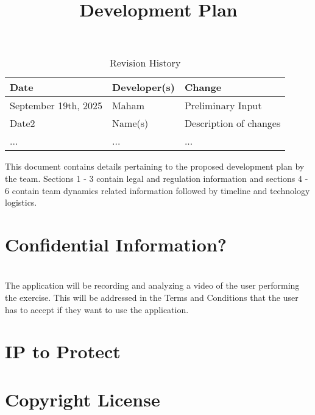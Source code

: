 \documentclass{article}
\title{Development Plan\\\progname}
\author{\authname}
\date{}
\begin{document}
\maketitle

\begin{table}[hp]
\caption{Revision History} \label{TblRevisionHistory}
\begin{tabularx}{\textwidth}{llX}
\toprule
\textbf{Date} & \textbf{Developer(s)} & \textbf{Change}\\
\midrule
September 19th, 2025 & Maham & Preliminary Input \\
Date2 & Name(s) & Description of changes\\
... & ... & ...\\
\bottomrule
\end{tabularx}
\end{table}

\newpage{}


This document contains details pertaining to the proposed development plan by the team.
Sections 1 - 3 contain legal and regulation information and sections 4 - 6 contain team dynamics related information
followed by timeline and technology logistics. \\


\section{Confidential Information?}

\\
The application will be recording and analyzing a video of the user performing the exercise. This will 
be addressed in the Terms and Conditions that the user has to accept if they want to use the application. 

\section{IP to Protect}


\section{Copyright License}
\end{document}
